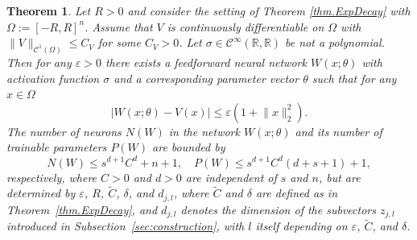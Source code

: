 \documentclass{article}
\newcommand{\R}{\mathbb{R}}
\newtheorem{theorem}[lemma]{Theorem}
\begin{document}
\begin{theorem} \label{thm:separableNN}
    Let $R > 0$ and consider the setting of Theorem \ref{thm.ExpDecay} with $\Omega := [-R,R]^n$.  Assume that $V$ is continuously differentiable on $\Omega$ with $\lVert V \rVert_{\mathcal{C}^1(\Omega)} \leq C_V$ for some $C_V > 0$. Let $\sigma \in \mathcal{C}^\infty(\R, \R)$ be not a polynomial. Then for any $\varepsilon > 0$ there exists a feedforward neural network $W(x; \theta)$ with activation function $\sigma$ and a corresponding parameter vector $\theta$ such that for any $x \in \Omega$
    \begin{equation*}
        \lvert W(x; \theta) - V(x) \rvert \leq \varepsilon ( 1 + \lVert x \rVert_2^2).
    \end{equation*}
    The number of neurons $N(W)$ in the network $W(x; \theta)$ and its number of trainable parameters $P(W)$ are bounded by
    \begin{equation*}
        N(W) \leq s^{d+1} C^d + n + 1, \quad P(W) \leq s^{d+1} C^d (d + s + 1) + 1, 
    \end{equation*}
    respectively, where $C > 0$ and $d > 0$ are independent of $s$ and $n$, but are determined by $\varepsilon$, $R$, $\widetilde{C}$, $\delta$, and $d_{j,l}$, where $\widetilde{C}$ and $\delta$ are defined as
    in Theorem~\ref{thm.ExpDecay}, and $d_{j,l}$ denotes the dimension of the subvectors $z_{j,l}$ introduced in Subsection~\ref{sec:construction}, with $l$ itself depending on $\varepsilon$, $\widetilde{C}$, and $\delta$.
\end{theorem}
\end{document}
